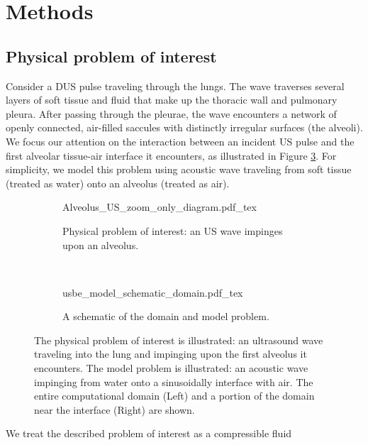 \documentclass{jfm}%
\begin{document}
\section{Methods}%
\label{sec:methods}%
\subsection{Physical problem of interest}
\label{subsec:physical_problem}
Consider a \ac{DUS} pulse traveling through the lungs. The wave
traverses several layers of soft tissue and fluid that make up the
thoracic wall and pulmonary pleura. After passing through the pleurae,
the wave encounters a network of openly connected, air-filled saccules
with distinctly irregular surfaces (the alveoli). We focus our
attention on the interaction between an incident \ac{US} pulse and the
first alveolar tissue-air interface it encounters, as illustrated in
Figure \ref{fig:schematics}. For simplicity, we model this
problem using acoustic wave traveling from soft tissue (treated as
water) onto an alveolus (treated as air). 
% 
\begin{figure}
  \centering
  \begin{subfigure}[b]{0.3\textwidth}
    \centering
    \def\svgwidth{\textwidth}
    {Alveolus_US_zoom_only_diagram.pdf_tex} \hfill%
    \caption{\label{fig:alveolar_schematic} Physical problem of interest: an \ac{US} wave impinges upon an alveolus.}
  \end{subfigure}
  ~
  \begin{subfigure}[b]{0.65\textwidth}
    \centering
    \def\svgwidth{\textwidth}
    {usbe_model_schematic_domain.pdf_tex} \hfill%
    \caption{\label{fig:problem_schematic} A schematic of the domain and model problem.}
  \end{subfigure}
  \caption[A schematic view of the physical and model
  problems]{\protect{} The physical
    problem of interest is illustrated: an ultrasound wave traveling
    into the lung and impinging upon the first alveolus it
    encounters.  The model problem is
    illustrated: an acoustic wave impinging from water onto a
    sinusoidally interface with air. The entire computational domain
    (Left) and a portion of the domain near the interface (Right) are
    shown.}
  \label{fig:schematics}
\end{figure}
% 
We treat the described problem of interest as a compressible fluid
\end{document}
